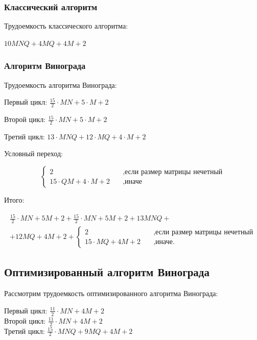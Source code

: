 \subsubsection{Классический алгоритм}

Трудоемкость классического алгоритма:

$10MNQ + 4MQ + 4M + 2$

\subsubsection{Алгоритм Винограда}

Трудоемкость алгоритма Винограда:

Первый цикл: $\frac{15}{2} \cdot MN + 5 \cdot M + 2$

Второй цикл: $\frac{15}{2} \cdot MN + 5 \cdot M + 2$

Третий цикл: $13 \cdot MNQ + 12 \cdot MQ + 4 \cdot M + 2$

Условный переход:

\begin{equation*}
    \begin{cases}
        2 & \quad \text{,если размер матрицы нечетный} \\
        15 \cdot QM + 4 \cdot M + 2 & \quad \text{,иначе}
    \end{cases}
\end{equation*}

Итого:

\begin{multline*}
    \frac{15}{2} \cdot MN + 5 M + 2 + \frac{15}{2} \cdot MN + 5 M + 2 + 13 MNQ + \\
     + 12 MQ + 4M + 2 + \begin{cases}
        2 & \quad \text{,если размер матрицы нечетный} \\
        15 \cdot MQ + 4M + 2 & \quad \text{,иначе.}
    \end{cases}
\end{multline*}

\subsection{Оптимизированный алгоритм Винограда}

Рассмотрим трудоемкость оптимизированного алгоритма Винограда:

\noindent
Первый цикл: $\frac{11}{2} \cdot MN + 4M + 2$ \\
Второй цикл: $\frac{11}{2} \cdot MN + 4M + 2$ \\
Третий цикл: $\frac{15}{2} \cdot MNQ + 9MQ + 4M + 2$ \\

